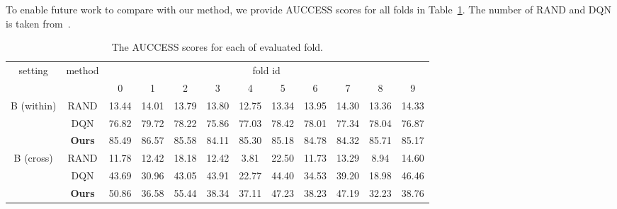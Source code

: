 \documentclass{article} \usepackage{iclr2021_conference,times}
\begin{document}
To enable future work to compare with our method, we provide AUCCESS scores for all folds in Table~\ref{tab:phyre_detail}. The number of RAND and DQN is taken from~\citet{bakhtin2019phyre}.

\begin{table}[h]
\centering
\setlength{\tabcolsep}{3pt}
\renewcommand{\arraystretch}{1.37}
\begin{tabular}{c|c|cccccccccc}
\multirow{2}{*}{setting} & \multirow{2}{*}{method} & \multicolumn{10}{c}{fold id} \\
& & 0 & 1 & 2 & 3 & 4 & 5 & 6 & 7 & 8 & 9 \\
\hline
\hline
\multirow{3}{*}{B (within)} & RAND & 13.44 & 14.01 & 13.79 & 13.80 & 12.75 & 13.34 & 13.95 & 14.30 & 13.36 & 14.33 \\
 & DQN & 76.82 & 79.72 & 78.22 & 75.86 & 77.03 & 78.42 & 78.01 & 77.34 & 78.04 & 76.87 \\
 & \textbf{Ours} & 85.49 & 86.57 & 85.58 & 84.11 & 85.30 & 85.18 & 84.78 & 84.32 & 85.71 & 85.17 \\
\hline
\multirow{3}{*}{B (cross)}  & RAND & 11.78 & 12.42 & 18.18 & 12.42 & 3.81 & 22.50 & 11.73 & 13.29 & 8.94 & 14.60\\
& DQN & 43.69 & 30.96 & 43.05 & 43.91 & 22.77 & 44.40 & 34.53 & 39.20 & 18.98 & 46.46 \\
& \textbf{Ours} & 50.86 & 36.58 & 55.44 & 38.34 & 37.11 & 47.23 & 38.23 & 47.19 & 32.23 & 38.76 \\
\end{tabular}
\caption{The AUCCESS scores for each of evaluated fold.}
\label{tab:phyre_detail}
\vspace{-1.0em}
\end{table}
\end{document}
